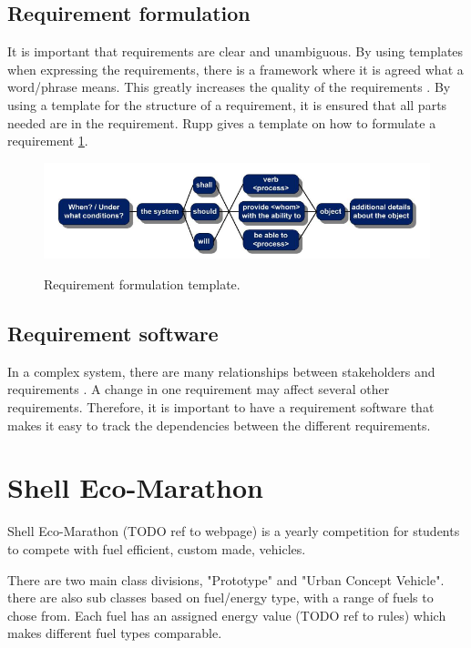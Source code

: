 \subsection{Requirement formulation}
It is important that requirements are clear and unambiguous. By using templates
when expressing the requirements, there is a framework where it is agreed what a
word/phrase means. This greatly increases the quality of the requirements
\cite{rupp2014}. By using a template for the structure of a requirement, it is
ensured that all parts needed are in the requirement. Rupp \cite{rupp2014}
gives a template on how to formulate a requirement \ref{fig:req_template}.
\begin{figure}[H]
    \centering
    \includegraphics[width=\textwidth]{./img/introduction_req_template}
    \label{fig:req_template}
    \caption{Requirement formulation template.}
\end{figure}

\subsection{Requirement software}
In a complex system, there are many relationships between stakeholders and
requirements \cite{ibm_req}. A change in one requirement may affect several other
requirements.  Therefore, it is important to have a requirement software that
makes it easy to track the dependencies between the different requirements.



\section{Shell Eco-Marathon}
Shell Eco-Marathon (TODO ref to webpage) is a yearly competition for students to compete with fuel efficient, custom made, vehicles.

There are two main class divisions, "Prototype" and "Urban Concept Vehicle". there are also sub classes based on fuel/energy type, with a range of fuels to chose from. Each fuel has an assigned energy value (TODO ref to rules) which makes different fuel types comparable. 

